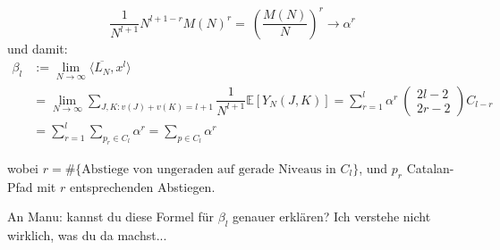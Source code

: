 \documentclass[a4paper, 11pt]{scrreprt}
\newcommand{\EE}{\mathbb{E}}
\begin{document}
	\begin{equation}
		\frac {1}{N^{l+1}} N^{l+1-r}M(N)^r =~ \left( \dfrac{M(N)}{N}\right)^{r}\to \alpha^r
	\end{equation}
und damit:
	\begin{equation}
	\begin{split}
		\beta_l &:= \lim_{N\to\infty} \langle \overline{L_N}, x^l \rangle\\
		&= \lim_{N \to \infty} \sum_{J,K: v(J)+v(K) = l+1} \dfrac{1}{N^{l+1}}\EE[Y_N(J,K)] = \sum_{r=1}^{l} \alpha^r\ \begin{pmatrix} 2l-2\\2r-2\end{pmatrix} C_{l-r} \\
		&= \sum_{r=1}^{l} \sum_{p_{r} \in C_{l}} \alpha^{r} = \sum_{p\in C_l} \alpha^r
	\end{split}
	\end{equation}

wobei \(r=\#\{\text{Abstiege von ungeraden auf gerade Niveaus in } C_l\}\), und \(p_r\) Catalan-Pfad mit \(r\) entsprechenden Abstiegen.



An Manu: kannst du diese Formel für \(\beta_l\) genauer erklären? Ich verstehe nicht wirklich, was du da machst...\\
\end{document}
